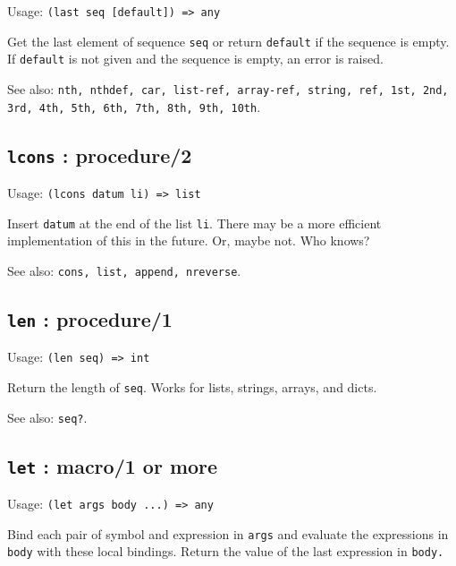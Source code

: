\documentclass[
]{article}
\newcommand{\passthrough}[1]{#1}
\begin{document}
Usage: \passthrough{\lstinline!(last seq [default]) => any!}

Get the last element of sequence \passthrough{\lstinline!seq!} or return
\passthrough{\lstinline!default!} if the sequence is empty. If
\passthrough{\lstinline!default!} is not given and the sequence is
empty, an error is raised.

See also:
\passthrough{\lstinline!nth, nthdef, car, list-ref, array-ref, string, ref, 1st, 2nd, 3rd, 4th, 5th, 6th, 7th, 8th, 9th, 10th!}.

\hypertarget{lcons-procedure2-1}{%
\subsection{\texorpdfstring{\texttt{lcons} :
procedure/2}{lcons : procedure/2}}\label{lcons-procedure2-1}}

Usage: \passthrough{\lstinline!(lcons datum li) => list!}

Insert \passthrough{\lstinline!datum!} at the end of the list
\passthrough{\lstinline!li!}. There may be a more efficient
implementation of this in the future. Or, maybe not. Who knows?

See also: \passthrough{\lstinline!cons, list, append, nreverse!}.

\hypertarget{len-procedure1-1}{%
\subsection{\texorpdfstring{\texttt{len} :
procedure/1}{len : procedure/1}}\label{len-procedure1-1}}

Usage: \passthrough{\lstinline!(len seq) => int!}

Return the length of \passthrough{\lstinline!seq!}. Works for lists,
strings, arrays, and dicts.

See also: \passthrough{\lstinline!seq?!}.

\hypertarget{let-macro1-or-more-1}{%
\subsection{\texorpdfstring{\texttt{let} : macro/1 or
more}{let : macro/1 or more}}\label{let-macro1-or-more-1}}

Usage: \passthrough{\lstinline!(let args body ...) => any!}

Bind each pair of symbol and expression in
\passthrough{\lstinline!args!} and evaluate the expressions in
\passthrough{\lstinline!body!} with these local bindings. Return the
value of the last expression in \passthrough{\lstinline!body.!}
\end{document}
